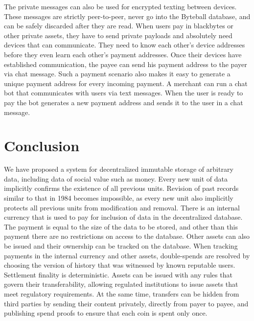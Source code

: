 \documentclass[a4paper, dvipdfmx]{jsarticle}
\begin{document}
The private messages can also be used for encrypted texting between devices. These messages are strictly peer-to-peer, never go into the Byteball database, and can be safely discarded after they are read.
When users pay in blackbytes or other private assets, they have to send private payloads and absolutely need devices that can communicate. They need to know each other’s device addresses before they even learn each other’s payment addresses. Once their devices have established communication, the payee can send his payment address to the payer via chat message. Such a payment scenario also makes it easy to generate a unique payment address for every incoming payment. A merchant can run a chat bot that communicates with users via text messages. When the user is ready to pay the bot generates a new payment address and sends it to the user in a chat message.


\section{Conclusion}
We have proposed a system for decentralized immutable storage of arbitrary data, including data of social value such as money. Every new unit of data implicitly confirms the existence of all previous units. Revision of past records similar to that in 1984 becomes impossible, as every new unit also implicitly protects all previous units from modification and removal. There is an internal currency that is used to pay for inclusion of data in the decentralized database. The payment is equal to the size of the data to be stored, and other than this payment there are no restrictions on access to the database. Other assets can also be issued and their ownership can be tracked on the database. When tracking payments in the internal currency and other assets, double-spends are resolved by choosing the version of history that was witnessed by known reputable users. Settlement finality is deterministic. Assets can be issued with any rules that govern their transferability, allowing regulated institutions to issue assets that meet regulatory requirements. At the same time, transfers can be hidden from third parties by sending their content privately, directly from payer to payee, and publishing spend proofs to ensure that each coin is spent only once.

\vspace{20pt}
\end{document}

